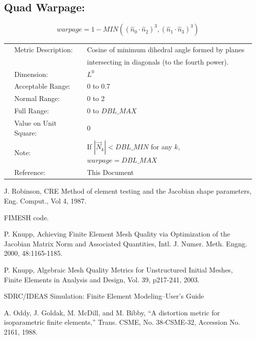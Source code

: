 \documentclass[12pt]{article}
\begin{document}
\subsection*{Quad Warpage:}

\begin{displaymath}
warpage =  1 - MIN \left( 
    \left( \hat n_0 \cdot \hat n_2  \right) ^ 3
   ,\left( \hat n_1 \cdot \hat n_3  \right) ^ 3
         \right)
\end{displaymath}

\begin{tabular}{lll}
& Metric Description:  & Cosine of minimum dihedral angle formed by planes \\
&                      & intersecting in diagonals (to the fourth power). \\
& Dimension:           & $L^0$              \\ 
& Acceptable Range:    & 0 to 0.7        \\ 
& Normal Range:        & 0 to 2          \\ 
& Full Range:          & 0 to $DBL\_MAX$ \\ 
& Value on Unit Square:& 0 \\
& Note:                & If $|\vec N_k| < DBL\_MIN$ for any $k$, $warpage = DBL\_MAX$  \\
& Reference:           &  This Document \\
\end{tabular} 




\begin{thebibliography}{99}

 J. Robinson, CRE Method of element 
testing and the Jacobian shape parameters, Eng. Comput., Vol 4, 1987.

 FIMESH code.

 P. Knupp, Achieving Finite Element Mesh Quality via 
Optimization of the Jacobian Matrix Norm and Associated Quantities,
Intl. J. Numer. Meth. Engng. 2000, 48:1165-1185.

 P. Knupp, Algebraic Mesh Quality Metrics for Unstructured 
Initial Meshes, Finite Elements in Analysis and Design, Vol. 39, p217-241,
2003.

 SDRC/IDEAS Simulation: Finite Element Modeling--User's Guide

 A. Oddy, J. Goldak, M. McDill, and M. Bibby, ``A distortion 
metric for isoparametric finite elements,'' Trans. CSME, No. 38-CSME-32, 
Accession No. 2161, 1988.

\end{thebibliography}
\end{document}

